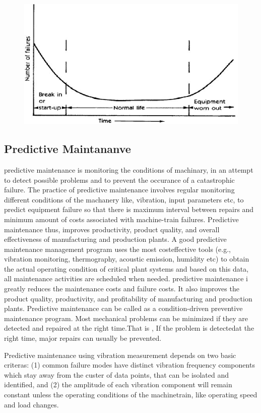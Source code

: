 \begin{figure}
	\centering
	\includegraphics[width=0.7\linewidth]{"picture-files/Bathtub curve"}
	\caption{}
	\label{fig:bathtub-curve}
\end{figure}



\subsection{Predictive Maintananve}

predictive maintenance is monitoring the conditions of machinary, in
an attempt to detect possible problems and to prevent the occurance of a catastrophic failure. The practice of predictive
maintenance involves regular monitoring different conditions of the  machanery like, vibration, input parameters etc, to predict equipment failure so that 
there is maximum interval
between repairs and minimum amount of costs associated with 
machine-train failures.
Predictive maintenance thus,  improves productivity,
product quality, and overall effectiveness of manufacturing and production
plants.
A good predictive maintenance management program uses the most costeffective
tools (e.g., vibration monitoring, thermography, acoustic emission, humidity etc) to obtain the
actual operating condition of critical plant systems and based on this data,
all maintenance activities are scheduled when needed.  predictive maintenance
i greatly reduces the  maintenance costs and failure costs. It also
improves the product quality, productivity, and profitability of manufacturing and
production plants.
Predictive maintenance can be called as a condition-driven preventive maintenance program. Most
mechanical problems can be minimized if they are detected and repaired at the right time.That is , If
the problem is detectedat the right time, major repairs can usually be prevented.

Predictive maintenance using vibration measurement depends on two basic criteras: (1)  common failure modes have distinct  vibration frequency components which stay away from the custer of data points,
that can be isolated and identified, and (2) the amplitude of each vibration
component will remain constant unless the operating conditions of the machinetrain, like operating speed and load
changes.



